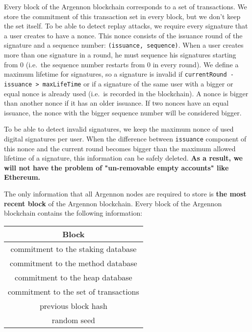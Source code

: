 Every block of the Argennon blockchain corresponds to a set of transactions. We store the commitment of this
transaction set in every block, but we don't keep the set itself. To be able to detect replay attacks, we require
every signature that a user creates to have a nonce. This nonce consists of the issuance round of the signature
and a sequence number: \texttt{(issuance,\ sequence)}. When a user creates more than one signature in a round, he
must sequence his signatures starting from 0 (i.e.~the sequence number restarts from 0 in every round). We define
a maximum lifetime for signatures, so a signature is invalid if \texttt{currentRound - issuance > maxLifeTime} or
if a signature of the same user with a bigger or equal nonce is already used
(i.e.~is recorded in the blockchain). A nonce is bigger than another nonce if it has an older issuance. If two
nonces have an equal issuance, the nonce with the bigger sequence number will be considered bigger.

To be able to detect invalid signatures, we keep the maximum nonce of used digital signatures per user. When the
difference between \texttt{issuance} component of this nonce and the current round becomes bigger than the
maximum allowed lifetime of a signature, this information can be safely deleted. \textbf{As a result, we will not
have the problem of "un-removable empty accounts" like Ethereum.}

The only information that all Argennon nodes are required to store is \textbf{the most recent block} of the Argennon
blockchain. Every block of the Argennon blockchain contains the following information:

\begin{center}
    \begin{tabular}{||c||}
        \hline
        \textbf{Block} \\ [0.5ex]
        \hline\hline
        commitment to the staking database \\ [0.7ex]
        commitment to the method database \\ [0.7ex]
        commitment to the heap database \\ [0.7ex]
        commitment to the set of transactions       \\ [0.7ex]
        previous block hash                         \\ [0.7ex]
        random seed                                 \\ [0.7ex]
        \hline
    \end{tabular}
\end{center}

